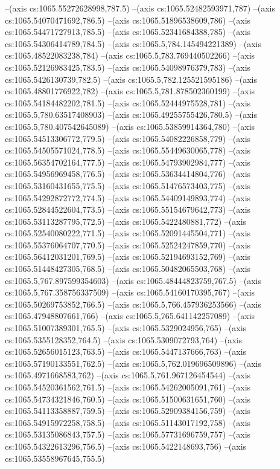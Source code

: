 --(axis cs:1065.55272628998,787.5)
--(axis cs:1065.52482593971,787)
--(axis cs:1065.54070471692,786.5)
--(axis cs:1065.51896538609,786)
--(axis cs:1065.54471727913,785.5)
--(axis cs:1065.52341684388,785)
--(axis cs:1065.54306414789,784.5)
--(axis cs:1065.5,784.145494221389)
--(axis cs:1065.48522083238,784)
--(axis cs:1065.5,783.769440502266)
--(axis cs:1065.52126983425,783.5)
--(axis cs:1065.54098976379,783)
--(axis cs:1065.5426130739,782.5)
--(axis cs:1065.5,782.125521595186)
--(axis cs:1065.48801776922,782)
--(axis cs:1065.5,781.878502360199)
--(axis cs:1065.54184482202,781.5)
--(axis cs:1065.52444975528,781)
--(axis cs:1065.5,780.63517408903)
--(axis cs:1065.49255755426,780.5)
--(axis cs:1065.5,780.407542645089)
--(axis cs:1065.53859914364,780)
--(axis cs:1065.54513306772,779.5)
--(axis cs:1065.54082226858,779)
--(axis cs:1065.54505571024,778.5)
--(axis cs:1065.55449630065,778)
--(axis cs:1065.56354702164,777.5)
--(axis cs:1065.54793902984,777)
--(axis cs:1065.54956969458,776.5)
--(axis cs:1065.53634414804,776)
--(axis cs:1065.53160431655,775.5)
--(axis cs:1065.51476573403,775)
--(axis cs:1065.54292872772,774.5)
--(axis cs:1065.54409149893,774)
--(axis cs:1065.52844522604,773.5)
--(axis cs:1065.55154679642,773)
--(axis cs:1065.53113287795,772.5)
--(axis cs:1065.5422480881,772)
--(axis cs:1065.52540080222,771.5)
--(axis cs:1065.52091445504,771)
--(axis cs:1065.55376064707,770.5)
--(axis cs:1065.52524247859,770)
--(axis cs:1065.56412031201,769.5)
--(axis cs:1065.52194693152,769)
--(axis cs:1065.51448427305,768.5)
--(axis cs:1065.50482065503,768)
--(axis cs:1065.5,767.897599354603)
--(axis cs:1065.48444823759,767.5)
--(axis cs:1065.5,767.358756337509)
--(axis cs:1065.54160170395,767)
--(axis cs:1065.50269753852,766.5)
--(axis cs:1065.5,766.457936253566)
--(axis cs:1065.47948807661,766)
--(axis cs:1065.5,765.641142257089)
--(axis cs:1065.51007389301,765.5)
--(axis cs:1065.5329024956,765)
--(axis cs:1065.5355128352,764.5)
--(axis cs:1065.5309072793,764)
--(axis cs:1065.52656015123,763.5)
--(axis cs:1065.5447137666,763)
--(axis cs:1065.57190133551,762.5)
--(axis cs:1065.5,762.019696509896)
--(axis cs:1065.4971668583,762)
--(axis cs:1065.5,761.967126454544)
--(axis cs:1065.54520361562,761.5)
--(axis cs:1065.54262005091,761)
--(axis cs:1065.54734321846,760.5)
--(axis cs:1065.51500631651,760)
--(axis cs:1065.54113358887,759.5)
--(axis cs:1065.52909384156,759)
--(axis cs:1065.54915972258,758.5)
--(axis cs:1065.51143017192,758)
--(axis cs:1065.53135086843,757.5)
--(axis cs:1065.57731696759,757)
--(axis cs:1065.54322613296,756.5)
--(axis cs:1065.5422148693,756)
--(axis cs:1065.53558967645,755.5)
